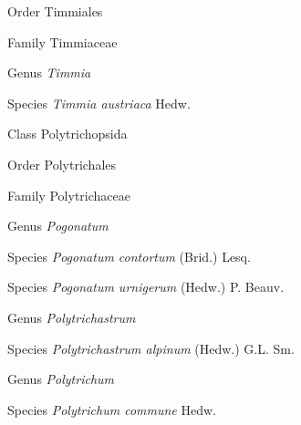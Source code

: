\documentclass[9pt, article]{memoir}
\begin{document}
\begin{multicols}{2}
\vspace{6pt}\noindent\hspace{18pt}Order Timmiales


\vspace{6pt}\noindent\hspace{24pt}Family Timmiaceae


\vspace{6pt}\noindent\hspace{30pt}Genus \textit{Timmia}


\vspace{6pt}\noindent\hspace{36pt}Species \textit{Timmia austriaca} Hedw.


\vspace{6pt}\noindent\hspace{12pt}Class Polytrichopsida


\vspace{6pt}\noindent\hspace{18pt}Order Polytrichales


\vspace{6pt}\noindent\hspace{24pt}Family Polytrichaceae


\vspace{6pt}\noindent\hspace{30pt}Genus \textit{Pogonatum}


\vspace{6pt}\noindent\hspace{36pt}Species \textit{Pogonatum contortum} (Brid.) Lesq.


\vspace{6pt}\noindent\hspace{36pt}Species \textit{Pogonatum urnigerum} (Hedw.) P. Beauv.


\vspace{6pt}\noindent\hspace{30pt}Genus \textit{Polytrichastrum}


\vspace{6pt}\noindent\hspace{36pt}Species \textit{Polytrichastrum alpinum} (Hedw.) G.L. Sm.


\vspace{6pt}\noindent\hspace{30pt}Genus \textit{Polytrichum}


\vspace{6pt}\noindent\hspace{36pt}Species \textit{Polytrichum commune} Hedw.



\end{multicols}
\end{document}
